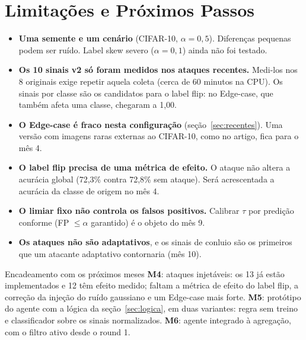 \documentclass[11pt,a4paper]{article}
\begin{document}
\section{Limitações e Próximos Passos}
\begin{itemize}
  \item \textbf{Uma semente e um cenário} (CIFAR-10, $\alpha = 0{,}5$). Diferenças pequenas podem ser ruído.
        Label skew severo ($\alpha = 0{,}1$) ainda não foi testado.
  \item \textbf{Os 10 sinais v2 só foram medidos nos ataques recentes.} Medi-los nos 8 originais exige
        repetir aquela coleta (cerca de 60 minutos na CPU). Os sinais por classe são os candidatos para o
        label flip: no Edge-case, que também afeta uma classe, chegaram a 1,00.
  \item \textbf{O Edge-case é fraco nesta configuração} (seção~\ref{sec:recentes}). Uma versão com
        imagens raras externas ao CIFAR-10, como no artigo, fica para o mês 4.
  \item \textbf{O label flip precisa de uma métrica de efeito.} O ataque não altera a acurácia global
        (72,3\% contra 72,8\% sem ataque). Será acrescentada a acurácia da classe de origem no mês 4.
  \item \textbf{O limiar fixo não controla os falsos positivos.} Calibrar $\tau$ por predição conforme
        (FP $\le \alpha$ garantido) é o objeto do mês 9.
  \item \textbf{Os ataques não são adaptativos}, e os sinais de conluio são os primeiros que um atacante
        adaptativo contornaria (mês 10).
\end{itemize}

\begin{calloutbox}{Encadeamento com os próximos meses}
\textbf{M4}: ataques injetáveis: os 13 já estão implementados e 12 têm efeito medido; faltam a métrica de
efeito do label flip, a correção da injeção do ruído gaussiano e um Edge-case mais forte.
\textbf{M5}: protótipo do agente com a lógica da seção~\ref{sec:logica}, em duas variantes: regra sem
treino e classificador sobre os sinais normalizados.
\textbf{M6}: agente integrado à agregação, com o filtro ativo desde o round 1.
\end{calloutbox}
\end{document}
